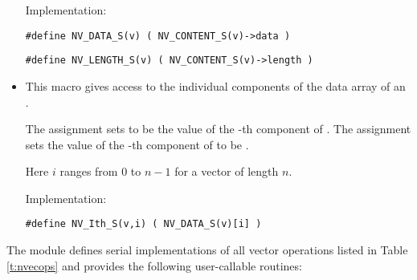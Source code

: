 \begin{itemize}
  Implementation: 
  
  \verb|#define NV_DATA_S(v) ( NV_CONTENT_S(v)->data )|
  
  \verb|#define NV_LENGTH_S(v) ( NV_CONTENT_S(v)->length )|

\item {}                                               
                                                            
  This macro gives access to the individual components of the data
  array of an .

  The assignment  sets  to be the value of 
  the -th component of . The assignment    
  sets the value of the -th component of  to be .        
  
  Here $i$ ranges from $0$ to $n-1$ for a vector of length $n$.

  Implementation:

  \verb|#define NV_Ith_S(v,i) ( NV_DATA_S(v)[i] )|

\end{itemize}
The {\nvecs} module defines serial implementations of all vector operations listed 
in Table \ref{t:nvecops} and provides the following user-callable routines:
